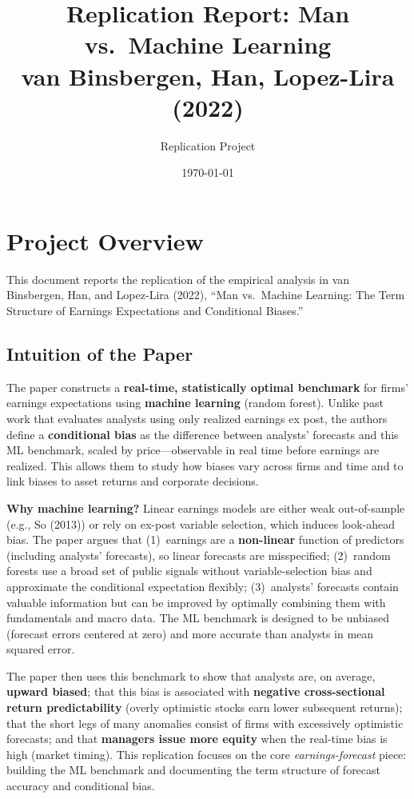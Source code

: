 \documentclass[11pt]{article}
\begin{document}
\title{Replication Report: Man vs.\ Machine Learning\\
{\large van Binsbergen, Han, Lopez-Lira (2022)}}
\author{Replication Project}
\date{\today}
\maketitle

\section{Project Overview}

This document reports the replication of the empirical analysis in van Binsbergen, Han, and Lopez-Lira (2022), ``Man vs.\ Machine Learning: The Term Structure of Earnings Expectations and Conditional Biases.''

\subsection{Intuition of the Paper}

The paper constructs a \textbf{real-time, statistically optimal benchmark} for firms' earnings expectations using \textbf{machine learning} (random forest). Unlike past work that evaluates analysts using only realized earnings ex post, the authors define a \textbf{conditional bias} as the difference between analysts' forecasts and this ML benchmark, scaled by price---observable in real time before earnings are realized. This allows them to study how biases vary across firms and time and to link biases to asset returns and corporate decisions.

\textbf{Why machine learning?} Linear earnings models are either weak out-of-sample (e.g., So (2013)) or rely on ex-post variable selection, which induces look-ahead bias. The paper argues that (1)~earnings are a \textbf{non-linear} function of predictors (including analysts' forecasts), so linear forecasts are misspecified; (2)~random forests use a broad set of public signals without variable-selection bias and approximate the conditional expectation flexibly; (3)~analysts' forecasts contain valuable information but can be improved by optimally combining them with fundamentals and macro data. The ML benchmark is designed to be unbiased (forecast errors centered at zero) and more accurate than analysts in mean squared error.

The paper then uses this benchmark to show that analysts are, on average, \textbf{upward biased}; that this bias is associated with \textbf{negative cross-sectional return predictability} (overly optimistic stocks earn lower subsequent returns); that the short legs of many anomalies consist of firms with excessively optimistic forecasts; and that \textbf{managers issue more equity} when the real-time bias is high (market timing). This replication focuses on the core \emph{earnings-forecast} piece: building the ML benchmark and documenting the term structure of forecast accuracy and conditional bias.
\end{document}
